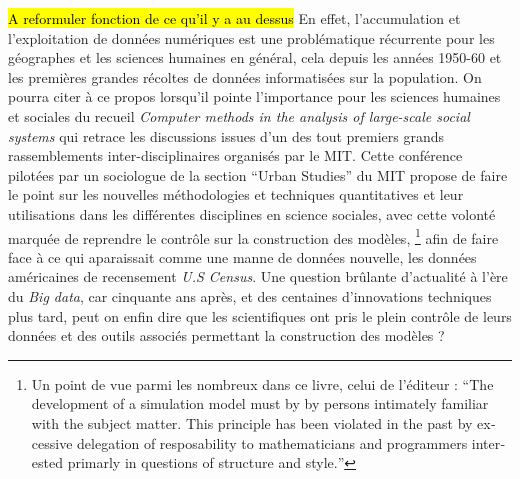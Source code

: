 \hl{A reformuler fonction de ce qu'il y a au dessus}
En effet, l'accumulation et l'exploitation de données numériques est une problématique récurrente pour les géographes et les sciences humaines en général, cela depuis les années 1950-60 \autocite{Kao1963, Hagerstrand1967b} \autocite[386]{Barnes2011} et les premières grandes récoltes de données informatisées sur la population. On pourra citer à ce propos \textcite{Gullahorn1966} lorsqu'il pointe l'importance pour les sciences humaines et sociales du recueil \textit{Computer methods in the analysis of large-scale social systems} qui retrace les discussions issues d'un des tout premiers grands rassemblements inter-disciplinaires organisés par le MIT. Cette conférence pilotées par un sociologue de la section \foreignquote{english}{Urban Studies} du MIT \autocite{Beshers1965} propose de faire le point sur les nouvelles méthodologies et techniques quantitatives et leur utilisations dans les différentes disciplines en science sociales, avec cette volonté marquée de reprendre le contrôle sur la construction des modèles, \footnote{Un point de vue parmi les nombreux dans ce livre, celui de l'éditeur \textcite[194]{Beshers1965} : \foreignquote{english}{The development of a simulation model must by by persons intimately familiar with the subject matter. This principle has been violated in the past by excessive delegation of resposability to mathematicians and programmers interested primarly in questions of structure and style.} } afin de faire face à ce qui aparaissait comme une manne de données nouvelle, les données américaines de recensement \textit{U.S Census}. Une question brûlante d'actualité à l'ère du \textit{Big data}, car cinquante ans après, et des centaines d'innovations techniques plus tard, peut on enfin dire que les scientifiques ont pris le plein contrôle de leurs données et des outils associés permettant la construction des modèles ?

